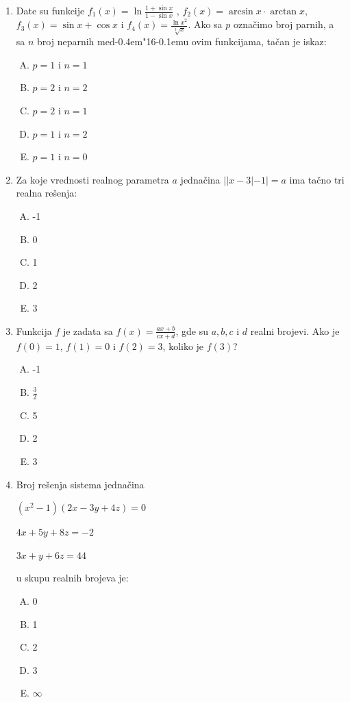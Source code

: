 \documentclass[a4paper,12pt]{report}
\def\dj{d\kern-0.4em\char"16\kern-0.1em}
\begin{document}
\begin{enumerate}[1.]
\item Date su funkcije  $ f_1(x) = \ln \frac{1 + \sin{x}}{1 - \sin{x}}$ , $ f_2(x) = \arcsin{x} \cdot \arctan{x} $, $ f_3(x) = \sin{x} + \cos{x} $ i $f_4(x) = \frac{\ln{x^2}}{\sqrt[3]{x}} $. Ako sa $p$ ozna\v{c}imo broj parnih, a sa $n$ broj neparnih me\dj{}u ovim funkcijama, ta\v{c}an je iskaz:
\begin{multicols}{3}
\begin{enumerate}[A)]
\item $p = 1$ i $n = 1$ \item $p = 2$ i $n = 2$ \item $p = 2$ i $n = 1$ \item $p = 1$ i $n = 2$ \item $p = 1$ i $n = 0$
\end{enumerate}
\end{multicols}



\item Za koje vrednosti realnog parametra $a$ jedna\v{c}ina $||x-3|-1|=a$ ima ta\v{c}no tri realna re\v{s}enja:
\begin{multicols}{5}
\begin{enumerate}[A)]
\item -1 \item 0 \item 1 \item 2 \item 3
\end{enumerate}
\end{multicols}


\item Funkcija $f$ je zadata sa $f(x) = \frac{ax +b}{cx+d} $, gde su $a,b,c$ i $d$ realni brojevi. Ako je $f(0) = 1$,  $f(1) = 0$ i  $f(2) = 3$, koliko je  $f(3)$?
\begin{multicols}{5}
\begin{enumerate}[A)]
\item -1 \item $\frac{3}{2}$ \item 5 \item 2 \item 3
\end{enumerate}
\end{multicols}


\item Broj re\v{s}enja sistema jedna\v{c}ina 
\par $(x^{2} - 1)(2x -3y + 4z) = 0$
\par $4x + 5y +8z = -2$
\par $3x + y + 6z = 44$
\par u skupu realnih brojeva je: 
\begin{multicols}{5}
\begin{enumerate}[A)]
\item 0 \item 1 \item 2 \item 3 \item $\infty$
\end{enumerate}
\end{multicols}


\end{enumerate}
\end{document}
